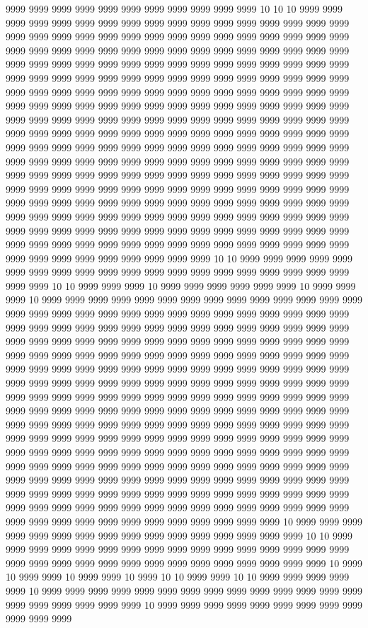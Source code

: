 9999 9999 9999 9999 9999 9999 9999 9999 9999 9999 9999 10 10 10 9999 9999 9999 9999 9999 9999 9999 9999 9999 9999 9999 9999 9999 9999 9999 9999 9999 9999 9999 9999 9999 9999 9999 9999 9999 9999 9999 9999 9999 9999 9999 9999 9999 9999 9999 9999 9999 9999 9999 9999 9999 9999 9999 9999 9999 9999 9999 9999 9999 9999 9999 9999 9999 9999 9999 9999 9999 9999 9999 9999 9999 9999 9999 9999 9999 9999 9999 9999 9999 9999 9999 9999 9999 9999 9999 9999 9999 9999 9999 9999 9999 9999 9999 9999 9999 9999 9999 9999 9999 9999 9999 9999 9999 9999 9999 9999 9999 9999 9999 9999 9999 9999 9999 9999 9999 9999 9999 9999 9999 9999 9999 9999 9999 9999 9999 9999 9999 9999 9999 9999 9999 9999 9999 9999 9999 9999 9999 9999 9999 9999 9999 9999 9999 9999 9999 9999 9999 9999 9999 9999 9999 9999 9999 9999 9999 9999 9999 9999 9999 9999 9999 9999 9999 9999 9999 9999 9999 9999 9999 9999 9999 9999 9999 9999 9999 9999 9999 9999 9999 9999 9999 9999 9999 9999 9999 9999 9999 9999 9999 9999 9999 9999 9999 9999 9999 9999 9999 9999 9999 9999 9999 9999 9999 9999 9999 9999 9999 9999 9999 9999 9999 9999 9999 9999 9999 9999 9999 9999 9999 9999 9999 9999 9999 9999 9999 9999 9999 9999 9999 9999 9999 9999 9999 9999 9999 9999 9999 9999 9999 9999 9999 9999 9999 9999 9999 9999 9999 9999 9999 9999 9999 9999 9999 9999 9999 9999 9999 9999 9999 9999 9999 9999 9999 9999 9999 9999 9999 9999 9999 9999 9999 9999 9999 9999 9999 9999 10 10 9999 9999 9999 9999 9999 9999 9999 9999 9999 9999 9999 9999 9999 9999 9999 9999 9999 9999 9999 9999 9999 9999 10 10 9999 9999 9999 10 9999 9999 9999 9999 9999 9999 10 9999 9999 9999 10 9999 9999 9999 9999 9999 9999 9999 9999 9999 9999 9999 9999 9999 9999 9999 9999 9999 9999 9999 9999 9999 9999 9999 9999 9999 9999 9999 9999 9999 9999 9999 9999 9999 9999 9999 9999 9999 9999 9999 9999 9999 9999 9999 9999 9999 9999 9999 9999 9999 9999 9999 9999 9999 9999 9999 9999 9999 9999 9999 9999 9999 9999 9999 9999 9999 9999 9999 9999 9999 9999 9999 9999 9999 9999 9999 9999 9999 9999 9999 9999 9999 9999 9999 9999 9999 9999 9999 9999 9999 9999 9999 9999 9999 9999 9999 9999 9999 9999 9999 9999 9999 9999 9999 9999 9999 9999 9999 9999 9999 9999 9999 9999 9999 9999 9999 9999 9999 9999 9999 9999 9999 9999 9999 9999 9999 9999 9999 9999 9999 9999 9999 9999 9999 9999 9999 9999 9999 9999 9999 9999 9999 9999 9999 9999 9999 9999 9999 9999 9999 9999 9999 9999 9999 9999 9999 9999 9999 9999 9999 9999 9999 9999 9999 9999 9999 9999 9999 9999 9999 9999 9999 9999 9999 9999 9999 9999 9999 9999 9999 9999 9999 9999 9999 9999 9999 9999 9999 9999 9999 9999 9999 9999 9999 9999 9999 9999 9999 9999 9999 9999 9999 9999 9999 9999 9999 9999 9999 9999 9999 9999 9999 9999 9999 9999 9999 9999 9999 9999 9999 9999 9999 9999 9999 9999 9999 9999 9999 9999 9999 9999 9999 9999 9999 9999 9999 9999 9999 9999 9999 9999 9999 9999 9999 9999 9999 9999 9999 9999 9999 9999 9999 10 9999 9999 9999 9999 9999 9999 9999 9999 9999 9999 9999 9999 9999 9999 9999 9999 10 10 9999 9999 9999 9999 9999 9999 9999 9999 9999 9999 9999 9999 9999 9999 9999 9999 9999 9999 9999 9999 9999 9999 9999 9999 9999 9999 9999 9999 9999 9999 10 9999 10 9999 9999 10 9999 9999 10 9999 10 10 9999 9999 10 10 9999 9999 9999 9999 9999 10 9999 9999 9999 9999 9999 9999 9999 9999 9999 9999 9999 9999 9999 9999 9999 9999 9999 9999 9999 9999 10 9999 9999 9999 9999 9999 9999 9999 9999 9999 9999 9999 9999 
